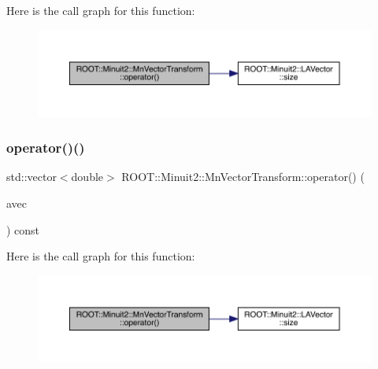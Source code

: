 Here is the call graph for this function\+:
\nopagebreak
\begin{figure}[H]
\begin{center}
\leavevmode
\includegraphics[width=350pt]{d1/d58/classROOT_1_1Minuit2_1_1MnVectorTransform_a2b16b519635ee775a78d3f62663bef89_cgraph}
\end{center}
\end{figure}
\mbox{\label{classROOT_1_1Minuit2_1_1MnVectorTransform_a2b16b519635ee775a78d3f62663bef89}} 
\subsubsection{\texorpdfstring{operator()()}{operator()()}\hspace{0.1cm}{\footnotesize\ttfamily [2/3]}}
{\footnotesize\ttfamily std\+::vector$<$double$>$ R\+O\+O\+T\+::\+Minuit2\+::\+Mn\+Vector\+Transform\+::operator() (\begin{DoxyParamCaption}\item[{const \mbox{\hyperlink{namespaceROOT_1_1Minuit2_a62ed97730a1ca8d3fbaec64a19aa11c9}{Mn\+Algebraic\+Vector}} \&}]{avec }\end{DoxyParamCaption}) const\hspace{0.3cm}{\ttfamily [inline]}}

Here is the call graph for this function\+:
\nopagebreak
\begin{figure}[H]
\begin{center}
\leavevmode
\includegraphics[width=350pt]{d1/d58/classROOT_1_1Minuit2_1_1MnVectorTransform_a2b16b519635ee775a78d3f62663bef89_cgraph}
\end{center}
\end{figure}
\mbox{\label{classROOT_1_1Minuit2_1_1MnVectorTransform_a2b16b519635ee775a78d3f62663bef89}} 
